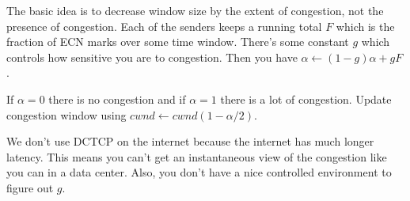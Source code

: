 \documentclass[psamsfonts]{amsart}
\begin{document}
The basic idea is to decrease window size by the extent of congestion, not the presence of congestion. Each of the senders keeps a running total $F$ which is the fraction of ECN marks over some time window. There's some constant $g$ which controls how sensitive you are to congestion. Then you have $\alpha \leftarrow (1 - g) \alpha + g F$.

If $\alpha = 0$ there is no congestion and if $\alpha = 1$ there is a lot of congestion. Update congestion window using $cwnd \leftarrow cwnd ( 1 - \alpha/2)$.

We don't use DCTCP on the internet because the internet has much longer latency. This means you can't get an instantaneous view of the congestion like you can in a data center. Also, you don't have a nice controlled environment to figure out $g$.
\end{document}
